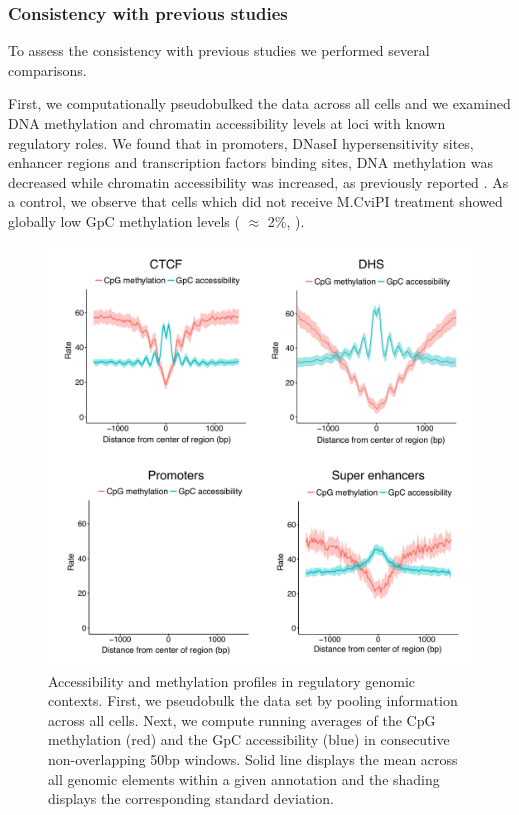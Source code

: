 \subsubsection{Consistency with previous studies}

To assess the consistency with previous studies we performed several comparisons.

First, we computationally pseudobulked the data across all cells and we examined DNA methylation and chromatin accessibility levels at loci with known regulatory roles. We found that in promoters, DNaseI hypersensitivity sites, enhancer regions and transcription factors binding sites, DNA methylation was decreased while chromatin accessibility was increased, as previously reported \cite{Pott2016}. As a control, we observe that cells which did not receive M.CviPI treatment showed globally low GpC methylation levels ( $\approx$ 2\%, ).

\begin{figure}[H]
	\centering
	\includegraphics[width=0.8\linewidth]{scNMT_pseudobulk_profiles}
	\caption[]{Accessibility and methylation profiles in regulatory genomic contexts. First, we pseudobulk the data set by pooling information across all cells. Next, we compute running averages  of the CpG methylation (red) and the GpC accessibility (blue) in consecutive non-overlapping 50bp windows. Solid line displays the mean across all genomic elements within a given annotation and the shading displays the corresponding standard deviation.}
	\label{fig:scnmt_profiles}
\end{figure}



